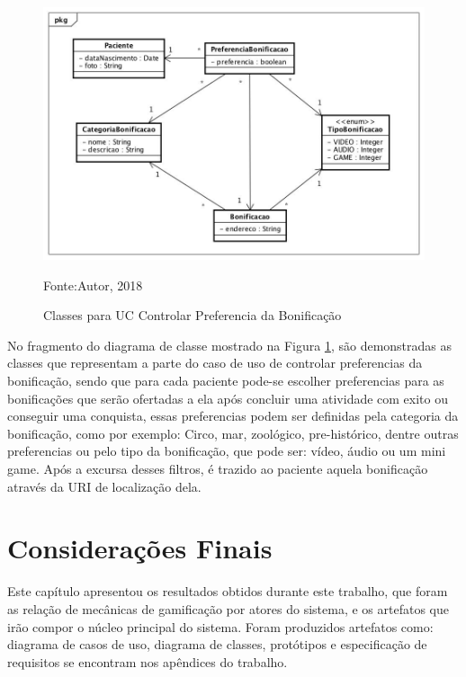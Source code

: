 \begin{figure}[H]
	\centering
	\includegraphics[scale=0.5]{img/UC_ControlarPreferenciasDeBonificacao.jpg}
	\caption{Classes para UC Controlar Preferencia da Bonificação}
		\label{pt1UC2}
	Fonte:Autor, 2018
\end{figure}
No fragmento do diagrama de classe mostrado na Figura \ref{pt1UC2}, são demonstradas as classes que representam a parte do caso de uso de controlar preferencias da bonificação, sendo que para cada paciente pode-se escolher preferencias para as bonificações que serão ofertadas a ela após concluir uma atividade com exito ou conseguir uma conquista, essas preferencias podem ser definidas pela categoria da bonificação, como por exemplo: Circo, mar, zoológico, pre-histórico, dentre outras preferencias ou pelo tipo da bonificação, que pode ser: vídeo, áudio ou um mini game. Após a excursa desses filtros, é trazido ao paciente aquela bonificação através da URI de localização dela.

\section{Considerações Finais}
Este capítulo apresentou os resultados obtidos durante este trabalho, que foram as relação de mecânicas de gamificação por atores do sistema, e os artefatos que irão compor o núcleo principal do sistema. Foram produzidos artefatos como: diagrama de casos de uso, diagrama de classes, protótipos e especificação de requisitos se encontram nos apêndices do trabalho.